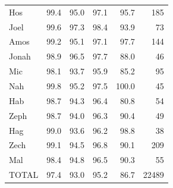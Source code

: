 \begin{table}[ht]
\begin{tabular}{lrrrrr}
Hos & 99.4 & 95.0 & 97.1 & 95.7 & 185 \\
Joel & 99.6 & 97.3 & 98.4 & 93.9 & 73 \\
Amos & 99.2 & 95.1 & 97.1 & 97.7 & 144 \\
Jonah & 98.9 & 96.5 & 97.7 & 88.0 & 46 \\
Mic & 98.1 & 93.7 & 95.9 & 85.2 & 95 \\
Nah & 99.8 & 95.2 & 97.5 & 100.0 & 45 \\
Hab & 98.7 & 94.3 & 96.4 & 80.8 & 54 \\
Zeph & 98.7 & 94.0 & 96.3 & 90.4 & 49 \\
Hag & 99.0 & 93.6 & 96.2 & 98.8 & 38 \\
Zech & 99.1 & 94.5 & 96.8 & 90.1 & 209 \\
Mal & 98.4 & 94.8 & 96.5 & 90.3 & 55 \\
\midrule
TOTAL & 97.4 & 93.0 & 95.2 & 86.7 & 22489 \\
\bottomrule
\end{tabular}
\end{table}
